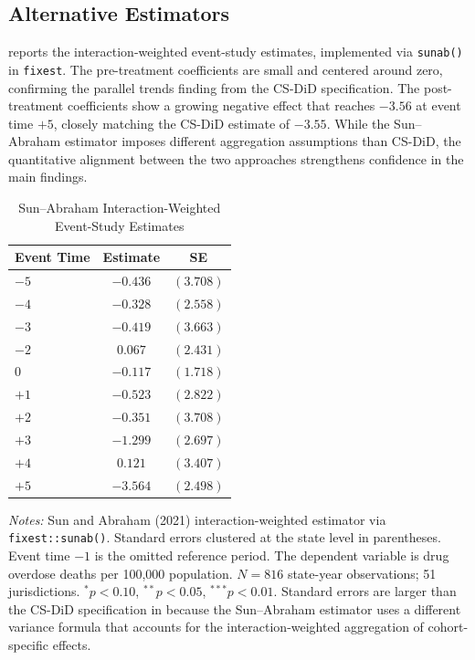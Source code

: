 \documentclass[12pt]{article}
\begin{document}
\subsection{Alternative Estimators}

 reports the \citet{sun2021estimating} interaction-weighted event-study estimates, implemented via \texttt{sunab()} in \texttt{fixest}. The pre-treatment coefficients are small and centered around zero, confirming the parallel trends finding from the CS-DiD specification. The post-treatment coefficients show a growing negative effect that reaches $-3.56$ at event time $+5$, closely matching the CS-DiD estimate of $-3.55$. While the Sun--Abraham estimator imposes different aggregation assumptions than CS-DiD, the quantitative alignment between the two approaches strengthens confidence in the main findings.

\begin{table}[H]
\centering
\caption{Sun--Abraham Interaction-Weighted Event-Study Estimates}
\label{tab:sunab}
\begin{tabular}{lcc}
\toprule
Event Time & Estimate & SE \\
\midrule
$-5$ & $-0.436$ & $(3.708)$ \\
$-4$ & $-0.328$ & $(2.558)$ \\
$-3$ & $-0.419$ & $(3.663)$ \\
$-2$ & $0.067$ & $(2.431)$ \\
\midrule
$0$ & $-0.117$ & $(1.718)$ \\
$+1$ & $-0.523$ & $(2.822)$ \\
$+2$ & $-0.351$ & $(3.708)$ \\
$+3$ & $-1.299$ & $(2.697)$ \\
$+4$ & $0.121$ & $(3.407)$ \\
$+5$ & $-3.564$ & $(2.498)$ \\
\bottomrule
\end{tabular}
\par\vspace{0.3em}
{\small\textit{Notes:} Sun and Abraham (2021) interaction-weighted estimator via \texttt{fixest::sunab()}. Standard errors clustered at the state level in parentheses. Event time $-1$ is the omitted reference period. The dependent variable is drug overdose deaths per 100,000 population. $N = 816$ state-year observations; 51 jurisdictions. $^{*}p<0.10$, $^{**}p<0.05$, $^{***}p<0.01$. Standard errors are larger than the CS-DiD specification in  because the Sun--Abraham estimator uses a different variance formula that accounts for the interaction-weighted aggregation of cohort-specific effects.}
\end{table}
\end{document}
